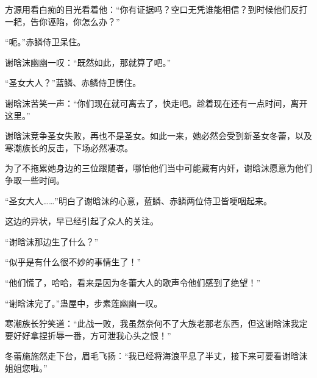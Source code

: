 \begin{this_body}
方源用看白痴的目光看着他：“你有证据吗？空口无凭谁能相信？到时候他们反打一耙，告你诬陷，你怎么办？”

“呃。”赤鳞侍卫呆住。

谢晗沫幽幽一叹：“既然如此，那就算了吧。”

“圣女大人？”蓝鳞、赤鳞侍卫愣住。

谢晗沫苦笑一声：“你们现在就可离去了，快走吧。趁着现在还有一点时间，离开这里。”

谢晗沫竞争圣女失败，再也不是圣女。如此一来，她必然会受到新圣女冬蕾，以及寒潮族长的反击，下场必然凄凉。

为了不拖累她身边的三位跟随者，哪怕他们当中可能藏有内奸，谢晗沫愿意为他们争取一些时间。

“圣女大人……”明白了谢晗沫的心意，蓝鳞、赤鳞两位侍卫皆哽咽起来。

这边的异状，早已经引起了众人的关注。

“谢晗沫那边生了什么？”

“似乎是有什么很不妙的事情生了！”

“他们慌了，哈哈，看来是因为冬蕾大人的歌声令他们感到了绝望！”

“谢晗沫完了。”蛊屋中，步素莲幽幽一叹。

寒潮族长狞笑道：“此战一败，我虽然奈何不了大族老那老东西，但这谢晗沫我定要好好拿捏折辱一番，方可泄我心头之恨！”

冬蕾施施然走下台，眉毛飞扬：“我已经将海浪平息了半丈，接下来可要看谢晗沫姐姐您啦。”

\end{this_body}

